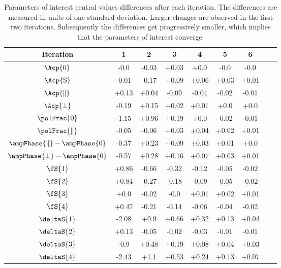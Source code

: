 \begin{table}[!h]
\centering
\footnotesize
\begin{tabular}{ c c c c c c c c c }
  \hline
  Iteration          &       1       &       2       &       3       &       4       &       5       &       6 \\  
  \hline
  $\Acp{0}$                           &  -0.0   &  -0.03  &  +0.03  &  +0.0   &  -0.0   &  -0.0    \\  
  $\Acp{\text{S}}$                    &  -0.01  &  -0.17  &  +0.09  &  +0.06  &  +0.03  &  +0.01   \\  
  $\Acp{\parallel}$                   &  +0.13  &  +0.04  &  -0.09  &  -0.04  &  -0.02  &  -0.01   \\  
  $\Acp{\perp}$                       &  -0.19  &  +0.15  &  +0.02  &  +0.01  &  +0.0   &  +0.0    \\  
  $\polFrac{0}$                       &  -1.15  &  +0.96  &  +0.19  &  +0.0   &  -0.02  &  -0.01   \\  
  $\polFrac{\parallel}$               &  -0.05  &  -0.06  &  +0.03  &  +0.04  &  +0.02  &  +0.01   \\  
  $\ampPhase{\parallel}-\ampPhase{0}$ &  -0.37  &  +0.23  &  +0.09  &  +0.03  &  +0.01  &  +0.0    \\  
  $\ampPhase{\perp}-\ampPhase{0}$     &  -0.57  &  +0.28  &  +0.16  &  +0.07  &  +0.03  &  +0.01   \\  
  $\fS{1}$                            &  +0.86  &  -0.66  &  -0.32  &  -0.12  &  -0.05  &  -0.02   \\  
  $\fS{2}$                            &  +0.84  &  -0.27  &  -0.18  &  -0.09  &  -0.05  &  -0.02   \\  
  $\fS{3}$                            &  +0.0   &  -0.02  &  -0.0   &  +0.01  &  +0.02  &  +0.01   \\  
  $\fS{4}$                            &  +0.47  &  -0.21  &  -0.14  &  -0.06  &  -0.04  &  -0.02   \\  
  $\deltaS{1}$                        &  -2.08  &  +0.9   &  +0.66  &  +0.32  &  +0.13  &  +0.04   \\  
  $\deltaS{2}$                        &  +0.13  &  -0.05  &  -0.02  &  -0.03  &  -0.01  &  -0.01   \\  
  $\deltaS{3}$                        &  -0.9   &  +0.48  &  +0.19  &  +0.08  &  +0.04  &  +0.03   \\  
  $\deltaS{4}$                        &  -2.43  &  +1.1   &  +0.53  &  +0.24  &  +0.13  &  +0.07   \\  
  \hline
\end{tabular}
\caption{Parameters of interest central values differences after each iteration. The differences are measured in units of one
         standard deviation. Larger changes are observed in the first two iterations. Subsequently the differences get progressively
         smaller, which implies that the parameters of interest converge.}
\label{pars_convergence}
\end{table}

